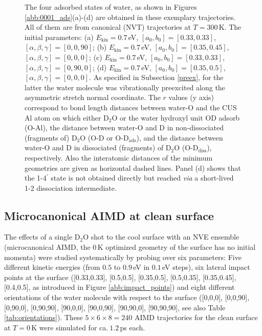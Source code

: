\documentclass[11pt,DIV=13,BCOR=5mm,a4paper,headinclude]{scrbook}
\begin{document}
\begin{figure}[h!]
\caption{The four adsorbed states of water, as shown in Figures \ref{abb:0001_ads}(a)-(d) are obtained in these exemplary trajectories.
All of them are from canonical (NVT) trajectories at  $T=300\,$K.
The initial parameters: (a) $E_\textrm{kin}=0.7\,$eV, $[a_0,b_0]=[0.33,0.33]$, $[\alpha,\beta,\gamma]=[0,0,90]$;
 (b) $E_\textrm{kin}=0.7\,$eV, $[a_0,b_0]=[0.35,0.45]$, $[\alpha,\beta,\gamma]=[0,0,0]$;
 (c) $E_\textrm{kin}=0.7\,$eV, $[a_0,b_0]=[0.33,0.33]$, $[\alpha,\beta,\gamma]=[0,90,0]$;
 (d) $E_\textrm{kin}=0.7\,$eV, $[a_0,b_0]=[0.35,0.5]$, $[\alpha,\beta,\gamma]=[0,0,0]$.
As specified in Subsection \ref{preex}, for the latter the water molecule was vibrationally preexcited along the asymmetric stretch normal coordinate.
The $r$ values (y axis) correspond to bond length distances between water-O and the CUS Al atom on which either D$_2$O or the water hydroxyl unit OD adsorb (O-Al), the distance between water-O and D in non-dissociated (fragments of) D$_2$O (O-D or O-D$_\textrm{ads}$), and the  distance between water-O and D in dissociated (fragments) of D$_2$O (O-D$_\textrm{diss}$), respectively.
Also the interatomic distances of the minimum geometries are given as horizontal dashed lines.
Panel (d) shows that the 1-4$^\prime$ state is not obtained directly but reached \textit{via} a short-lived 1-2 dissociation intermediate.}
\label{abb:ex_traj}
\end{figure}


\subsection{Microcanonical AIMD at clean surface}\label{sec:mic_clean}
The effects of a single D$_2$O shot to the cool surface with an NVE ensemble (microcanonical AIMD, the $0\,$K optimized geometry of the surface has no initial momenta) were studied systematically by probing over six parameters: Five different kinetic energies (from $0.5$ to $0.9\,$eV in $0.1\,$eV steps), six lateral impact points at the surface ([0.33,0.33], [0.5,0.5], [0.35,0.5], [0.5,0.35], [0.35,0.45], [0.4,0.5], as introduced in Figure \ref{abb:impact_points}) and eight different orientations of the water molecule with respect to the surface ([0,0,0], [0,0,90], [0,90,0], [0,90,90], [90,0,0], [90,0,90], [90,90,0], [90,90,90], see also Table \ref{tab:orientations}).
These $5\times 6\times 8=240$ AIMD trajectories for the clean surface at $T=0\,$K were simulated for ca.$~1.2\,$ps each.
\end{document}
